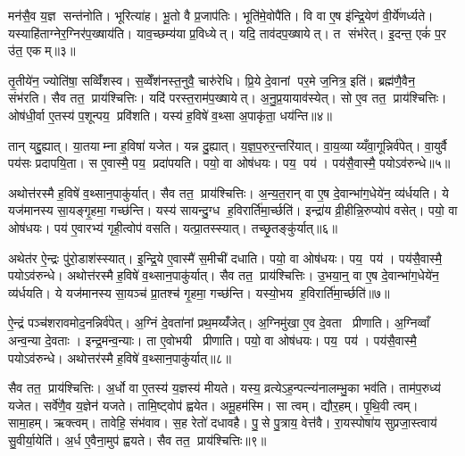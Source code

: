 मन॑सै॒व य॒ज्ञ सन्त॑नोति। भूरित्या॑ह। भू॒तो वै प्र॒जाप॑तिः। भूति॑मे॒वोपै॑ति। वि वा ए॒ष इ॑न्द्रि॒येण॑ वी॒र्ये॑णर्ध्यते। यस्याहि॑ताग्नेर॒ग्निर॑प॒ख्षाय॑ति। याव॒च्छम्य॑या प्र॒विध्येत्। यदि॒ ताव॑दप॒ख्षायेत्। त संभ॑रेत्। इ॒दन्त॒ एकं॑ प॒र उ॑त॒ एकम्॥३॥

तृ॒तीये॑न॒ ज्योति॑षा॒ सव्विँ॑शस्व। स॒व्वेँश॑नस्त॒नुवै॒ चारु॑रेधि। प्रि॒ये दे॒वानां पर॒मे ज॒नित्र॒ इति॑। ब्रह्म॑णै॒वैन॒ संभ॑रति। सैव तत॒ प्राय॑श्चित्तिः। यदि॑ परस्त॒राम॑प॒ख्षायेत्। अ॒नु॒प्र॒यायाव॑स्येत्। सो ए॒व तत॒ प्राय॑श्चित्तिः। ओष॑धी॒र्वा ए॒तस्य॑ प॒शून्पय॒ प्रवि॑शति। यस्य॑ ह॒विषे॑ व॒थ्सा अ॒पाकृ॑ता॒ धय॑न्ति॥४॥

तान् यद्दु॒ह्यात्। या॒तयाम्ना ह॒विषा॑ यजेत। यन्न दु॒ह्यात्। य॒ज्ञ॒प॒रुर॒न्तरि॑यात्। वा॒य॒व्याय्यँवा॒गून्निर्व॑पेत्। वा॒युर्वै पय॑सः प्रदापयि॒ता। स ए॒वास्मै॒ पय॒ प्रदा॑पयति। पयो॒ वा ओष॑धयः। पय॒ पय॑। पय॑सै॒वास्मै॒ पयोऽव॑रुन्धे॥५॥

अथोत्त॑रस्मै ह॒विषे॑ व॒थ्सान॒पाकु॑र्यात्। सैव तत॒ प्राय॑श्चित्तिः। अ॒न्य॒त॒रान् वा ए॒ष दे॒वान्भा॑ग॒धेये॑न॒ व्य॑र्धयति। ये यज॑मानस्य सा॒यङ्गृ॒हमा॒ गच्छ॑न्ति। यस्य॑ सायन्दु॒ग्ध ह॒विरार्ति॑मा॒र्च्छति॑। इन्द्रा॑य व्री॒हीन्नि॒रुप्योप॑ वसेत्। पयो॒ वा ओष॑धयः। पय॑ ए॒वारभ्य॑ गृही॒त्वोप॑ वसति। यत्प्रा॒तस्स्यात्। तच्छृ॒तङ्कु॑र्यात्॥६॥

अथेत॑र ऐ॒न्द्रः पु॑रो॒डाश॑स्स्यात्। इ॒न्द्रि॒ये ए॒वास्मै॑ स॒मीची॑ दधाति। पयो॒ वा ओष॑धयः। पय॒ पय॑। पय॑सै॒वास्मै॒ पयोऽव॑रुन्धे। अथोत्त॑रस्मै ह॒विषे॑ व॒थ्सान॒पाकु॑र्यात्। सैव तत॒ प्राय॑श्चित्तिः। उ॒भया॒न्॒ वा ए॒ष दे॒वान्भा॑ग॒धेये॑न॒ व्य॑र्धयति। ये यज॑मानस्य सा॒यञ्च॑ प्रा॒तश्च॑ गृ॒हमा॒ गच्छ॑न्ति। यस्यो॒भय ह॒विरार्ति॑मा॒र्च्छति॑॥७॥

ऐ॒न्द्रं पञ्च॑शरावमोद॒नन्निर्व॑पेत्। अ॒ग्निं दे॒वता॑नां प्रथ॒मय्यँ॑जेत्। अ॒ग्निमु॑खा ए॒व दे॒वता प्रीणाति। अ॒ग्निव्वाँ अन्व॒न्या दे॒वताः। इन्द्र॒मन्व॒न्याः। ता ए॒वोभयी प्रीणाति। पयो॒ वा ओष॑धयः। पय॒ पय॑। पय॑सै॒वास्मै॒ पयोऽव॑रुन्धे। अथोत्तर॑स्मै ह॒विषे॑ व॒थ्सान॒पाकु॑र्यात्॥८॥

सैव तत॒ प्राय॑श्चित्तिः। अ॒र्धो वा ए॒तस्य॑ य॒ज्ञस्य॑ मीयते। यस्य॒ व्रत्येऽह॒न्पत्न्य॑नालम्भु॒का भव॑ति। ताम॑प॒रुध्य॑ यजेत। सर्वे॑णै॒व य॒ज्ञेन॑ यजते। तामि॒ष्ट्वोप॑ ह्वयेत। अमू॒हम॑स्मि। सा त्वम्। द्यौर॒हम्। पृ॒थि॒वी त्वम्। सामा॒हम्। ऋक्त्वम्। तावेहि॒ संभ॑वाव। स॒ह रेतो॑ दधावहै। पु॒से पु॒त्राय॒ वेत्त॑वै। रा॒यस्पोषा॑य सुप्रजा॒स्त्वाय॑ सु॒वीर्या॒येति॑। अ॒र्ध ए॒वैना॒मुप॑ ह्वयते। सैव तत॒ प्राय॑श्चित्तिः॥९॥\anuvakamend[द॒धा॒ति॒ य॒ज्ञ उ॑त॒ एक॒न्धय॑न्ति रुन्धे कुर्यादा॒र्च्छत्य॒पाकु॑र्यात्पृथि॒वी त्वम॒ष्टौ च॑ (सर्वा॒न्॒ वि वै यदि॑ परस्त॒रामोष॑धीरन्यत॒रानु॒भया॑न॒र्धो वै ॥ )]


